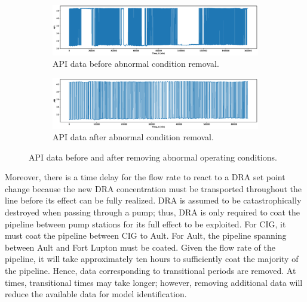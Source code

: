 \begin{figure}[h]
     \centering
     \begin{subfigure}[b]{1.0\textwidth}
         \centering
         \includegraphics[width=\textwidth]{images/08NonFilteredDensity.eps}
         \caption{API data before abnormal condition removal.}
         \label{fig:08APIBefore}
     \end{subfigure}
     \hfill
     \begin{subfigure}[b]{1.0\textwidth}
         \centering
         \includegraphics[width=\textwidth]{images/08FilteredDensity.eps}
         \caption{API data after abnormal condition removal.}
         \label{fig:08APIAfter}
     \end{subfigure}
        \caption{API data before and after removing abnormal operating conditions.}
        \label{fig:08API}
\end{figure}

Moreover, there is a time delay for the flow rate to react to a DRA set point change because the new DRA concentration must be transported throughout the line before its effect can be fully realized.  DRA is assumed to be catastrophically destroyed when passing through a pump; thus, DRA is only required to coat the pipeline between pump stations for its full effect to be exploited.  For CIG, it must coat the pipeline between CIG to Ault.  For Ault, the pipeline spanning between Ault and Fort Lupton must be coated.  Given the flow rate of the pipeline, it will take approximately ten hours to sufficiently coat the majority of the pipeline. Hence, data corresponding to transitional periods are removed. At times, transitional times may take longer; however, removing additional data will reduce the available data for model identification.  

